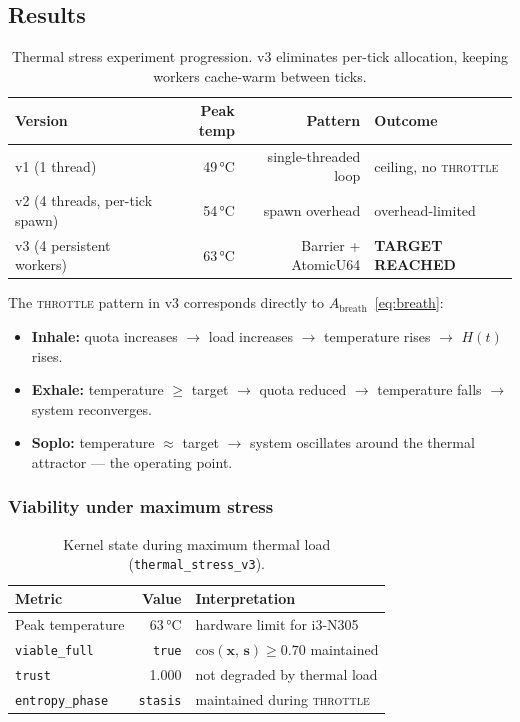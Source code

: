 \documentclass[11pt, a4paper]{article}
\newcommand{\stasis}{\bm{s}}
\newcommand{\sv}{\bm{x}}
\newcommand{\cosim}[2]{\mathrm{cos}\!\left(#1,\, #2\right)}
\begin{document}
\subsection{Results}

\begin{table}[h]
\centering
\begin{tabular}{lrrl}
\toprule
Version & Peak temp & Pattern & Outcome \\
\midrule
v1 (1 thread) & 49\,°C & single-threaded loop & ceiling, no \textsc{throttle} \\
v2 (4 threads, per-tick spawn) & 54\,°C & spawn overhead & overhead-limited \\
v3 (4 persistent workers) & 63\,°C & Barrier + AtomicU64 & \textbf{TARGET REACHED} \\
\bottomrule
\end{tabular}
\caption{Thermal stress experiment progression.
v3 eliminates per-tick allocation, keeping workers cache-warm between ticks.}
\label{tab:thermal}
\end{table}

The \textsc{throttle} pattern in v3 corresponds directly to
$A_\text{breath}$~\eqref{eq:breath}:
\begin{itemize}
  \item \textbf{Inhale:} quota increases $\to$ load increases $\to$
        temperature rises $\to$ $H(t)$ rises.
  \item \textbf{Exhale:} temperature $\ge$ target $\to$ quota reduced $\to$
        temperature falls $\to$ system reconverges.
  \item \textbf{Soplo:} temperature $\approx$ target $\to$ system oscillates
        around the thermal attractor — the operating point.
\end{itemize}

\subsubsection{Viability under maximum stress}

\begin{table}[h]
\centering
\begin{tabular}{lrl}
\toprule
Metric & Value & Interpretation \\
\midrule
Peak temperature & 63\,°C & hardware limit for i3-N305 \\
\texttt{viable\_full} & \texttt{true} & $\cosim{\sv}{\stasis} \ge 0.70$ maintained \\
\texttt{trust} & 1.000 & not degraded by thermal load \\
\texttt{entropy\_phase} & \texttt{stasis} & maintained during \textsc{throttle} \\
\bottomrule
\end{tabular}
\caption{Kernel state during maximum thermal load (\texttt{thermal\_stress\_v3}).}
\label{tab:viability}
\end{table}
\end{document}
